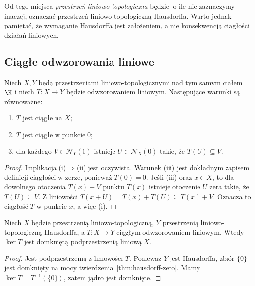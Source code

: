 \begin{uwaga}
Od tego miejsca \emph{przestrzeń liniowo-topologiczna} będzie,
o ile nie zaznaczymy inaczej, oznaczać przestrzeń liniowo-topologiczną
Hausdorffa. Warto jednak pamiętać, że wymaganie Hausdorffa jest
założeniem, a nie konsekwencją ciągłości działań liniowych.
\end{uwaga}

\subsection{Ciągłe odwzorowania liniowe}

\begin{twierdzenie}\label{thm:linear-continuity-zero}
Niech $X,Y$ będą przestrzeniami liniowo-topologicznymi nad tym samym
ciałem $\K$ i niech $T\colon X\to Y$ będzie odwzorowaniem liniowym.
Następujące warunki są równoważne:
\begin{enumerate}[label=\textup{(\roman*)}]
 \item $T$ jest ciągłe na $X$;
 \item $T$ jest ciągłe w punkcie $0$;
 \item dla każdego $V\in\mathcal N_Y(0)$ istnieje
       $U\in\mathcal N_X(0)$ takie, że $T(U)\subseteq V$.
\end{enumerate}
\end{twierdzenie}
\begin{proof}
Implikacja (i)$\Rightarrow$(ii) jest oczywista.
Warunek (iii) jest dokładnym zapisem definicji ciągłości w zerze,
ponieważ $T(0)=0$.
Jeśli (iii) oraz $x\in X$, to dla dowolnego otoczenia
$T(x)+V$ punktu $T(x)$ istnieje otoczenie $U$ zera takie,
że $T(U)\subseteq V$. Z liniowości
$T(x+U)=T(x)+T(U)\subseteq T(x)+V$.
Oznacza to ciągłość $T$ w punkcie $x$, a więc (i).
\end{proof}

\begin{wniosek}\label{cor:kernel-closed}
Niech $X$ będzie przestrzenią liniowo-topologiczną, $Y$
przestrzenią liniowo-topologiczną Hausdorffa, a $T\colon X\to Y$
ciągłym odwzorowaniem liniowym. Wtedy $\ker T$ jest domkniętą
podprzestrzenią liniową $X$.
\end{wniosek}
\begin{proof}
Jest podprzestrzenią z liniowości $T$. Ponieważ $Y$ jest
Hausdorffa, zbiór $\{0\}$ jest domknięty na mocy
twierdzenia~\ref{thm:hausdorff-zero}. Mamy
$\ker T=T^{-1}(\{0\})$, zatem jądro jest domknięte.
\end{proof}

